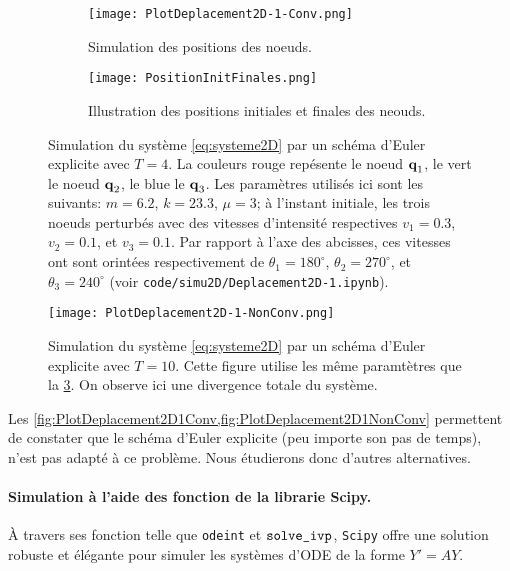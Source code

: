 \begin{figure}[!h]
    \begin{subfigure}[b]{0.7\textwidth}
        \centering
        \texttt{[image: PlotDeplacement2D-1-Conv.png]}
        \caption{Simulation des positions des noeuds.}
        \label{fig:dep}
    \end{subfigure}
    \begin{subfigure}[b]{0.7\textwidth}
        \centering
        \texttt{[image: PositionInitFinales.png]}
        \caption{Illustration des positions initiales et finales des neouds.}
        \label{fig:pos}
    \end{subfigure}
    \caption{Simulation du système \ref{eq:systeme2D} par un schéma d'Euler explicite avec $T = 4$. La couleurs rouge repésente le noeud $\bm{\mathrm{q}}_1$, le vert le noeud $\bm{\mathrm{q}}_2$, le blue le $\bm{\mathrm{q}}_3$. Les paramètres utilisés ici sont les suivants: $m=6.2$, $k=23.3$, $\mu=3$; à l'instant initiale, les trois noeuds perturbés avec des vitesses d'intensité respectives $v_1=0.3$, $v_2=0.1$, et $v_3=0.1$. Par rapport à l'axe des abcisses, ces vitesses ont sont orintées respectivement de $\theta_1=180^\circ$, $\theta_2=270^\circ$, et $\theta_3=240^\circ$ (voir \texttt{code/simu2D/Deplacement2D-1.ipynb}).}
    \label{fig:PlotDeplacement2D1Conv}
\end{figure}


\begin{figure}[!h]
    \centering
    \texttt{[image: PlotDeplacement2D-1-NonConv.png]}
    \caption{Simulation du système \ref{eq:systeme2D} par un schéma d'Euler explicite avec $T = 10$. Cette figure utilise les même paramtètres que la \cref{fig:PlotDeplacement2D1Conv}. On observe ici une divergence totale du système.}
    \label{fig:PlotDeplacement2D1NonConv}
\end{figure}

Les \cref{fig:PlotDeplacement2D1Conv,fig:PlotDeplacement2D1NonConv} permettent de constater que le schéma d'Euler explicite (peu importe son pas de temps), n'est pas adapté à ce problème. Nous étudierons donc d'autres alternatives. 

 
\paragraph{Simulation à l'aide des fonction de la librarie Scipy.} À travers ses fonction telle que \texttt{odeint} et $\verb|solve_ivp|$, \texttt{Scipy} offre une solution robuste et élégante pour simuler les systèmes d'ODE de la forme $Y' = AY$.


